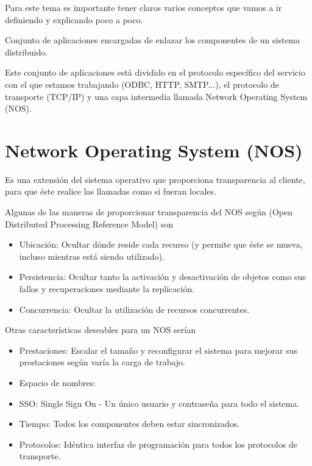 Para este tema es importante tener claros varios conceptos que vamos a ir definiendo y explicando poco a poco.

\begin{defn}[Middleware]
Conjunto de aplicaciones encargadas de enlazar los componentes de un sistema distribuido.
\end{defn}

Este conjunto de aplicaciones está dividido en el protocolo específico del servicio con el que estamos trabajando (ODBC, HTTP, SMTP...), el protocolo de transporte (TCP/IP) y una capa intermedia llamada Network Operating System (NOS).

\section{Network Operating System (NOS)}
\begin{defn}
Es una extensión del sistema operativo que proporciona transparencia al cliente, para que éste realice las llamadas como si fueran locales.
\label{NOS}
\end{defn}

Algunas de las maneras de proporcionar transparencia del NOS según  (Open Distributed Processing Reference Model) son
\begin{itemize}
\item Ubicación: Ocultar dónde reside cada recurso (y permite que éste se mueva, incluso mientras está siendo utilizado).
\item Persistencia: Ocultar tanto la activación y desactivación de objetos como sus fallos y recuperaciones mediante la replicación.
\item Concurrencia: Ocultar la utilización de recursos concurrentes.
\end{itemize}

Otras características deseables para un NOS serían
\begin{itemize}
\item Prestaciones: Escalar el tamaño y reconfigurar el sistema para mejorar sus prestaciones según varía la carga de trabajo.
\item Espacio de nombres:
\item SSO: Single Sign On - Un único usuario y contraseña para todo el sistema.
\item Tiempo: Todos los componentes deben estar sincronizados.
\item Protocolos: Idéntica interfaz de programación para todos los protocolos de transporte.
\end{itemize}

